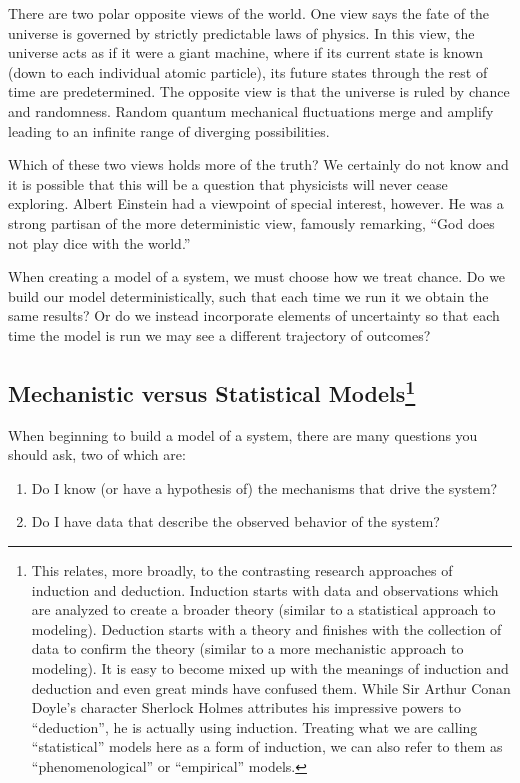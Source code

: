 \documentclass[]{memoir}
\begin{document}
There are two polar opposite views of the world. One view says the fate
of the universe is governed by strictly predictable laws of physics. In
this view, the universe acts as if it were a giant machine, where if its
current state is known (down to each individual atomic particle), its
future states through the rest of time are predetermined. The opposite
view is that the universe is ruled by chance and randomness. Random
quantum mechanical fluctuations merge and amplify leading to an infinite
range of diverging possibilities.

Which of these two views holds more of the truth? We certainly do not
know and it is possible that this will be a question that physicists
will never cease exploring. Albert Einstein had a viewpoint of special
interest, however. He was a strong partisan of the more deterministic
view, famously remarking, ``God does not play dice with the world.''

When creating a model of a system, we must choose how we treat chance.
Do we build our model deterministically, such that each time we run it
we obtain the same results? Or do we instead incorporate elements of
uncertainty so that each time the model is run we may see a different
trajectory of outcomes?

\subsection[Mechanistic versus Statistical Models]{Mechanistic versus
Statistical Models\footnote{This relates, more broadly, to the
  contrasting research approaches of induction and deduction. Induction
  starts with data and observations which are analyzed to create a
  broader theory (similar to a statistical approach to modeling).
  Deduction starts with a theory and finishes with the collection of
  data to confirm the theory (similar to a more mechanistic approach to
  modeling). It is easy to become mixed up with the meanings of
  induction and deduction and even great minds have confused them. While
  Sir Arthur Conan Doyle's character Sherlock Holmes attributes his
  impressive powers to ``deduction'', he is actually using induction.
  Treating what we are calling ``statistical'' models here as a form of
  induction, we can also refer to them as ``phenomenological'' or
  ``empirical'' models.}}

When beginning to build a model of a system, there are many questions
you should ask, two of which are:

\begin{enumerate}
\def\labelenumi{\arabic{enumi}.}
\itemsep1pt\parskip0pt
\item
  Do I know (or have a hypothesis of) the mechanisms that drive the
  system?
\item
  Do I have data that describe the observed behavior of the system?
\end{enumerate}
\end{document}
